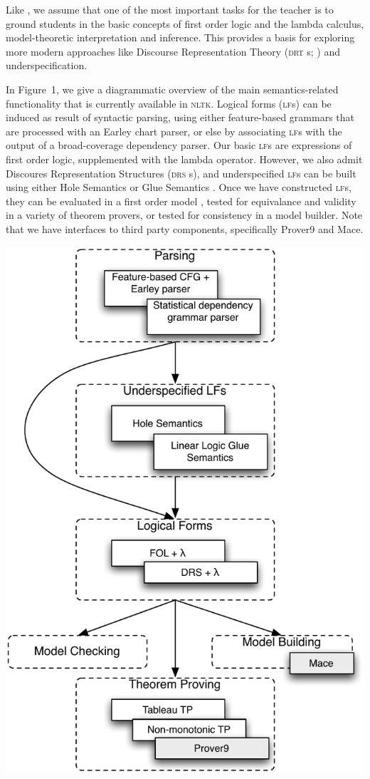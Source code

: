 \documentclass[11pt]{article}
\newcommand{\DRS}{\textsc{drs}}
\newcommand{\DRT}{\textsc{drt}}
\newcommand{\NLTK}{\textsc{nltk}}
\newcommand{\LF}{\textsc{lf}}
\begin{document}
Like \citep{BB}, we assume that one of the most important tasks
for the teacher is to ground students in the basic concepts of first
order logic and the lambda calculus, model-theoretic interpretation
and inference. This provides a basis for exploring more modern approaches like
Discourse Representation Theory (\DRT
s; \citet{KampReyle}) and underspecification. 

In Figure~1, we give a diagrammatic overview of the
main semantics-related functionality that is currently available in
\NLTK. 
Logical forms (\LF s) can be induced as result of syntactic parsing, using
either feature-based grammars that are processed with an Earley chart
parser, or else by associating \LF s with the output of a
broad-coverage dependency parser. Our basic \LF s are expressions of
first order logic, supplemented with the lambda operator. However, we
also admit Discoures Representation Structures (\DRS
s), and underspecified \LF s can be built using
either Hole Semantics \citep{BB} or Glue Semantics
\citep{Dalrymple2001}. Once we have constructed \LF s, they can be
evaluated in a first order model \citep{Klein06altw}, tested for
equivalance and validity in a variety of theorem provers, or tested for consistency in
a model builder. Note that we have interfaces to third party
components, specifically Prover9 and Mace.

\includegraphics[scale=.75]{modules}  
\end{document}
